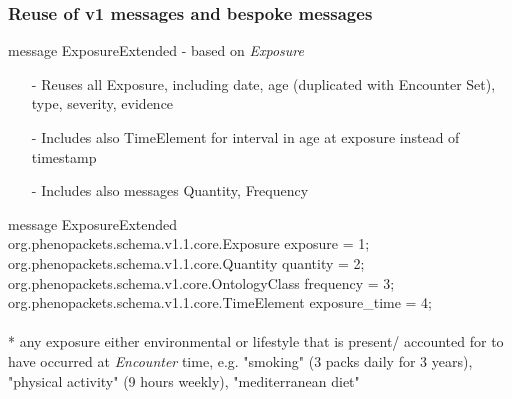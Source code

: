 \documentclass{beamer}
\begin{document}

\begin{frame}
\frametitle{Reuse of v1 messages and bespoke messages}
\begin{block}{message ExposureExtended - based on \textit{Exposure}}
\begin{itemize}
\item[-] Reuses all Exposure, including date, age (duplicated with Encounter Set), type, severity, evidence
\item[-] Includes also TimeElement for interval in age at exposure instead of timestamp
\item[-] Includes also messages Quantity, Frequency

\end{itemize}
\end{block}
message \colorbox{yellow!80}{ExposureExtended} \ { \\
    org.phenopackets.schema.v1.1.core.Exposure exposure = 1; \\
    org.phenopackets.schema.v1.1.core.Quantity quantity = 2; \\
    org.phenopackets.schema.v1.core.OntologyClass frequency = 3; \\
    org.phenopackets.schema.v1.1.core.TimeElement exposure\_time = 4; \\
\ } \\

{\color{blue}* any exposure either environmental or lifestyle that is present/ accounted for to have occurred at \textit{Encounter} time, e.g. "smoking" (3 packs daily for 3 years), "physical activity" (9 hours weekly), "mediterranean diet"}

\end{frame}
\end{document}
